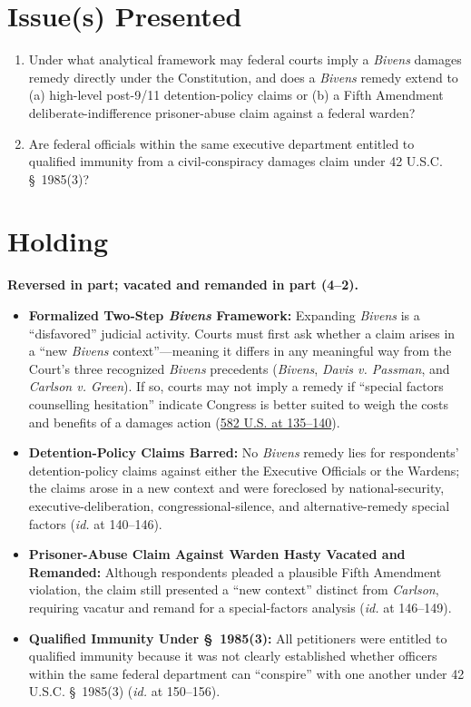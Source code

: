 \documentclass[12pt]{article}
\begin{document}
\section{Issue(s) Presented}

\begin{enumerate}
  \item Under what analytical framework may federal courts imply a \textit{Bivens} damages remedy directly under the Constitution, and does a \textit{Bivens} remedy extend to (a) high-level post-9/11 detention-policy claims or (b) a Fifth Amendment deliberate-indifference prisoner-abuse claim against a federal warden?
  \item Are federal officials within the same executive department entitled to qualified immunity from a civil-conspiracy damages claim under 42 U.S.C. \S~1985(3)?
\end{enumerate}

\section{Holding}

\textbf{Reversed in part; vacated and remanded in part (4--2).}

\begin{itemize}
  \item \textbf{Formalized Two-Step \textit{Bivens} Framework:} Expanding \textit{Bivens} is a ``disfavored'' judicial activity. Courts must first ask whether a claim arises in a ``new \textit{Bivens} context''---meaning it differs in any meaningful way from the Court's three recognized \textit{Bivens} precedents (\textit{Bivens}, \textit{Davis v. Passman}, and \textit{Carlson v. Green}). If so, courts may not imply a remedy if ``special factors counselling hesitation'' indicate Congress is better suited to weigh the costs and benefits of a damages action (\href{https://www.law.cornell.edu/supremecourt/text/15-1358}{582 U.S. at 135--140}).
  \item \textbf{Detention-Policy Claims Barred:} No \textit{Bivens} remedy lies for respondents' detention-policy claims against either the Executive Officials or the Wardens; the claims arose in a new context and were foreclosed by national-security, executive-deliberation, congressional-silence, and alternative-remedy special factors (\textit{id.} at 140--146).
  \item \textbf{Prisoner-Abuse Claim Against Warden Hasty Vacated and Remanded:} Although respondents pleaded a plausible Fifth Amendment violation, the claim still presented a ``new context'' distinct from \textit{Carlson}, requiring vacatur and remand for a special-factors analysis (\textit{id.} at 146--149).
  \item \textbf{Qualified Immunity Under \S~1985(3):} All petitioners were entitled to qualified immunity because it was not clearly established whether officers within the same federal department can ``conspire'' with one another under 42 U.S.C. \S~1985(3) (\textit{id.} at 150--156).
\end{itemize}
\end{document}
